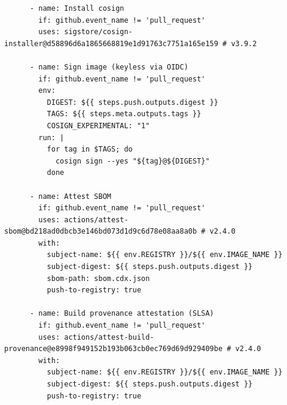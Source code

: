\documentclass[12pt, a4paper]{scrartcl}
\begin{document}
\begin{lstlisting}
      - name: Install cosign
        if: github.event_name != 'pull_request'
        uses: sigstore/cosign-installer@d58896d6a1865668819e1d91763c7751a165e159 # v3.9.2

      - name: Sign image (keyless via OIDC)
        if: github.event_name != 'pull_request'
        env:
          DIGEST: ${{ steps.push.outputs.digest }}
          TAGS: ${{ steps.meta.outputs.tags }}
          COSIGN_EXPERIMENTAL: "1"
        run: |
          for tag in $TAGS; do
            cosign sign --yes "${tag}@${DIGEST}"
          done

      - name: Attest SBOM
        if: github.event_name != 'pull_request'
        uses: actions/attest-sbom@bd218ad0dbcb3e146bd073d1d9c6d78e08aa8a0b # v2.4.0
        with:
          subject-name: ${{ env.REGISTRY }}/${{ env.IMAGE_NAME }}
          subject-digest: ${{ steps.push.outputs.digest }}
          sbom-path: sbom.cdx.json
          push-to-registry: true

      - name: Build provenance attestation (SLSA)
        if: github.event_name != 'pull_request'
        uses: actions/attest-build-provenance@e8998f949152b193b063cb0ec769d69d929409be # v2.4.0
        with:
          subject-name: ${{ env.REGISTRY }}/${{ env.IMAGE_NAME }}
          subject-digest: ${{ steps.push.outputs.digest }}
          push-to-registry: true
\end{lstlisting}
\end{document}
